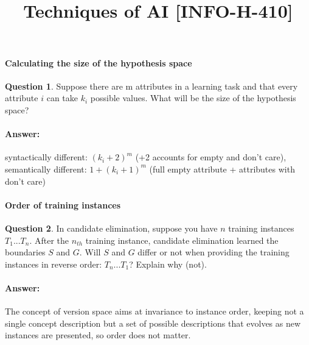 \documentclass[11pt,a4paper]{article}
\date{\vspace{-1.7cm}\version}
\title{\vspace{-2cm} \tpnumber \\ Techniques of AI [INFO-H-410] \ifthenelse{\boolean{corrige}}{~\\Correction}{}}
\theoremstyle{definition}%
\newtheorem{Q}{Question}[] %
\newcommand{\reponse}[1]{%
\ifthenelse {\boolean{corrige}} {\paragraph{Answer:} \color{darkblue}   #1\color{black}} {}
}
\begin{document}

\maketitle


\paragraph{Calculating the size of the hypothesis space}
\begin{Q}
    Suppose there are m attributes in a learning task and that every attribute $i$ can take $k_i$
possible values. What will be the size of the hypothesis space?
\reponse{
    syntactically different: $(k_i+2)^m$ (+2 accounts for empty and don't care),
    semantically different: $1+(k_i+1)^m$ (full empty attribute + attributes with don't care)
}
\end{Q}

\paragraph{Order of training instances}
\begin{Q}
    In candidate elimination, suppose you have $n$ training instances $T_1...T_n$. After the $n_{th}$
training instance, candidate elimination learned the boundaries $S$ and $G$. Will $S$ and $G$
differ or not when providing the training instances in reverse order: $T_n...T_1$? Explain why
(not).
\reponse{
   The concept of version space aims at invariance to instance order, keeping not a
single concept description but a set of possible descriptions that evolves as new instances
are presented, so order does not matter.
}
\end{Q}
\end{document}
